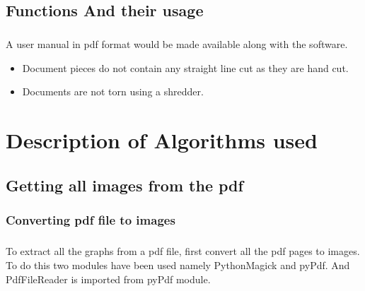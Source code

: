\documentclass[12pts]{scrreprt}
\begin{document}
\section{Functions And their usage}
\paragraph{}
A user manual in pdf format would be made available along with the software.
\begin{itemize}
   \item Document pieces do not contain any straight line cut as they are hand cut.
   \item Documents are not torn using a shredder.
\end{itemize}

\chapter{Description of Algorithms used}

\section{Getting all images from the pdf}
\subsection{Converting pdf file to images}
\paragraph{}
To extract all the graphs from a pdf file, first convert all the pdf pages to images. To do this two modules have been used namely PythonMagick and pyPdf. And PdfFileReader is imported from pyPdf module.
\end{document}
